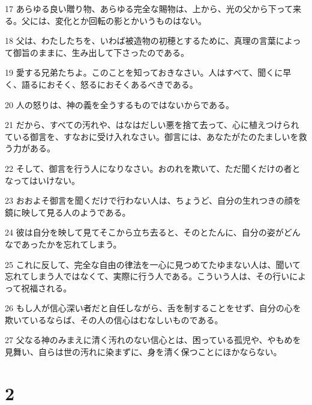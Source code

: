 \par 17 あらゆる良い贈り物、あらゆる完全な賜物は、上から、光の父から下って来る。父には、変化とか回転の影とかいうものはない。
\par 18 父は、わたしたちを、いわば被造物の初穂とするために、真理の言葉によって御旨のままに、生み出して下さったのである。
\par 19 愛する兄弟たちよ。このことを知っておきなさい。人はすべて、聞くに早く、語るにおそく、怒るにおそくあるべきである。
\par 20 人の怒りは、神の義を全うするものではないからである。
\par 21 だから、すべての汚れや、はなはだしい悪を捨て去って、心に植えつけられている御言を、すなおに受け入れなさい。御言には、あなたがたのたましいを救う力がある。
\par 22 そして、御言を行う人になりなさい。おのれを欺いて、ただ聞くだけの者となってはいけない。
\par 23 おおよそ御言を聞くだけで行わない人は、ちょうど、自分の生れつきの顔を鏡に映して見る人のようである。
\par 24 彼は自分を映して見てそこから立ち去ると、そのとたんに、自分の姿がどんなであったかを忘れてしまう。
\par 25 これに反して、完全な自由の律法を一心に見つめてたゆまない人は、聞いて忘れてしまう人ではなくて、実際に行う人である。こういう人は、その行いによって祝福される。
\par 26 もし人が信心深い者だと自任しながら、舌を制することをせず、自分の心を欺いているならば、その人の信心はむなしいものである。
\par 27 父なる神のみまえに清く汚れのない信心とは、困っている孤児や、やもめを見舞い、自らは世の汚れに染まずに、身を清く保つことにほかならない。

\chapter{2}


